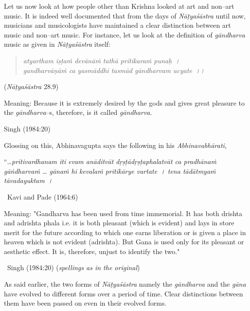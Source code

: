 Let us now look at how people other than Krishna looked at art and non–art music. It is indeed well documented that from the days of \textit{Nāṭyaśāstra} until now, musicians and musicologists have maintained a clear distinction between art music and non–art music. For instance, let us look at the definition of \textit{gāndharva} music as given in \textit{Nāṭyaśāstra} itself:

\begin{verse}
\textit{atyartham iṣṭaṁ devānāṁ tathā prītikaraṁ punaḥ~।}\\\textit{gandharvāṇāṁ ca yasmāddhi tasmād gāndharvam ucyate~।।}
\end{verse}

\begin{flushright}
(\textit{Nāṭyaśāstra} 28.9)
\end{flushright}

Meaning: Because it is extremely desired by the gods and gives great pleasure to the \textit{gāndharva}–s, therefore, is it called \textit{gāndharva}.

\begin{flushright}
Singh (1984:20)
\end{flushright}

Glossing on this, Abhinavagupta says the following in his \textit{Abhinavabhārati},

\begin{myquote}
“…\textit{prītivardhanam iti evam anāditvāt dṛṣṭādṛṣṭaphalatvāt ca pradhānaṁ gāṅdharvaṁ … gānaṁ hi kevalaṁ prītikārye vartate~। tena tādātmyaṁ tāvadayuktam~।} 

~\hfill Kavi and Pade (1964:6)
\end{myquote}

\begin{myquote}
Meaning: "Gandharva has been used from time immemorial. It has both drishta and adrishta phala i.e. it is both pleasant (which is evident) and lays in store merit for the future according to which one earns liberation or is given a place in heaven which is not evident (adrishta). But Gana is used only for its pleasant or aesthetic effect. It is, therefore, unjust to identify the two." 

~\hfill Singh (1984:20) (\textit{spellings as in the original})
\end{myquote}

As said earlier, the two forms of \textit{Nāṭyaśāstra} namely the \textit{gāndharva} and the \textit{gāna} have evolved to different forms over a period of time. Clear distinctions between them have been passed on even in their evolved forms.

